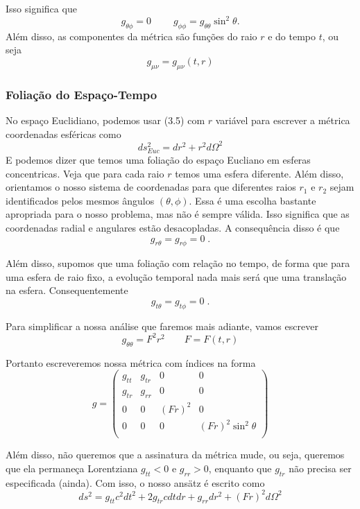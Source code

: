 \documentclass[11pt]{article}
\begin{document}
Isso significa que \[ \tag{3.8}  \boxed{g_{\theta \phi} = 0}\; \qquad 
\boxed{g_{\phi\phi}   = g_{\theta\theta} \sin^2\theta }. \] Além disso,
as componentes da métrica são funções do raio \(r\) e do tempo \(t\), ou
seja \[ \tag{3.9}  \boxed{g_{\mu\nu} = g_{\mu\nu}(t,r)}\]

    \hypertarget{foliauxe7uxe3o-do-espauxe7o-tempo}{%
\subsubsection{Foliação do
Espaço-Tempo}\label{foliauxe7uxe3o-do-espauxe7o-tempo}}

    No espaço Euclidiano, podemos usar (3.5) com \(r\) variável para
escrever a métrica coordenadas esféricas como
\[\tag{3.10} ds_{Euc}^2 = dr^2 + r^2 d\Omega^2\] E podemos dizer que
temos uma foliação do espaço Eucliano em esferas concentricas. Veja que
para cada raio \(r\) temos uma esfera diferente. Além disso, orientamos
o nosso sistema de coordenadas para que diferentes raios \(r_1\) e
\(r_2\) sejam identificados pelos mesmos ângulos \((\theta, \phi)\).
Essa é uma escolha bastante apropriada para o nosso problema, mas não é
sempre válida. Isso significa que as coordenadas radial e angulares
estão desacopladas. A consequência disso é que
\[ \tag{3.11} \boxed{g_{r \theta} = g_{r \phi} = 0}\; . \]

Além disso, supomos que uma foliação com relação no tempo, de forma que
para uma esfera de raio fixo, a evolução temporal nada mais será que uma
translação na esfera. Consequentemente
\[ \tag{3.12} \boxed{g_{t \theta} = g_{t \phi} = 0}\; . \]

    Para simplificar a nossa análise que faremos mais adiante, vamos
escrever \[ \tag{3.13} g_{\theta \theta} = F^2 r^2 \qquad F = F(t,r)\]

Portanto escreveremos nossa métrica com índices na forma
\[ \tag{3.14} g = 
\begin{pmatrix}
g_{tt} & g_{tr} & 0 & 0 \\
g_{tr} & g_{rr} & 0 & 0 \\
0 & 0 & (F r)^2  & 0 \\
0 & 0 & 0 & (F r)^2 \sin^2\theta \\
\end{pmatrix} \]

Além disso, não queremos que a assinatura da métrica mude, ou seja,
queremos que ela permaneça Lorentziana \(g_{tt} < 0\) e \(g_{rr} > 0\),
enquanto que \(g_{tr}\) não precisa ser especificada (ainda). Com isso,
o nosso ansätz é escrito como
\[ \tag{3.15} ds^2 = g_{tt} c^2 dt^2 + 2 g_{tr} c dt dr + g_{rr} dr^2 + (F r)^2 d \Omega^2  \]
\end{document}
